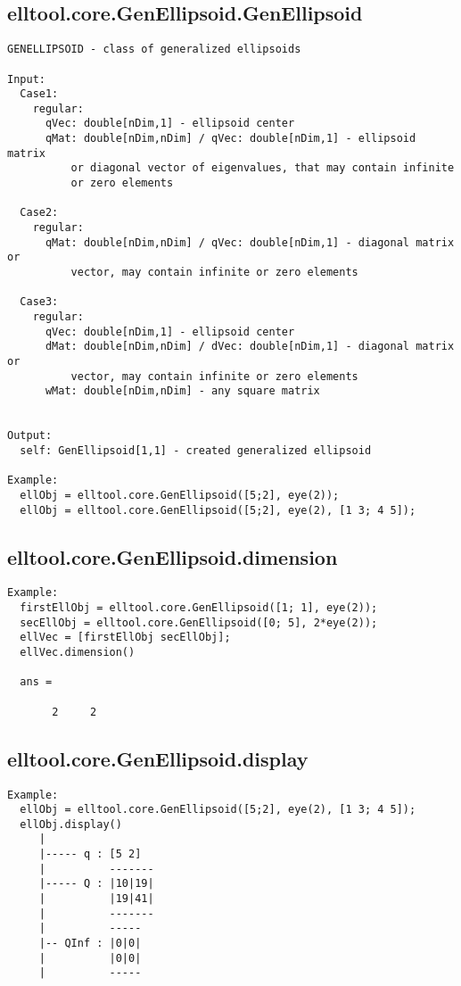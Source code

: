 \subsection{\texorpdfstring{elltool.core.GenEllipsoid.GenEllipsoid}{GenEllipsoid}}\label{method:elltool.core.GenEllipsoid.GenEllipsoid}
\begin{verbatim}
GENELLIPSOID - class of generalized ellipsoids

Input:
  Case1:
    regular:
      qVec: double[nDim,1] - ellipsoid center
      qMat: double[nDim,nDim] / qVec: double[nDim,1] - ellipsoid matrix
          or diagonal vector of eigenvalues, that may contain infinite
          or zero elements

  Case2:
    regular:
      qMat: double[nDim,nDim] / qVec: double[nDim,1] - diagonal matrix or
          vector, may contain infinite or zero elements

  Case3:
    regular:
      qVec: double[nDim,1] - ellipsoid center
      dMat: double[nDim,nDim] / dVec: double[nDim,1] - diagonal matrix or
          vector, may contain infinite or zero elements
      wMat: double[nDim,nDim] - any square matrix


Output:
  self: GenEllipsoid[1,1] - created generalized ellipsoid

Example:
  ellObj = elltool.core.GenEllipsoid([5;2], eye(2));
  ellObj = elltool.core.GenEllipsoid([5;2], eye(2), [1 3; 4 5]);
\end{verbatim}
\subsection{\texorpdfstring{elltool.core.GenEllipsoid.dimension}{dimension}}\label{method:elltool.core.GenEllipsoid.dimension}
\begin{verbatim}
Example:
  firstEllObj = elltool.core.GenEllipsoid([1; 1], eye(2));
  secEllObj = elltool.core.GenEllipsoid([0; 5], 2*eye(2));
  ellVec = [firstEllObj secEllObj];
  ellVec.dimension()

  ans =

       2     2
\end{verbatim}
\subsection{\texorpdfstring{elltool.core.GenEllipsoid.display}{display}}\label{method:elltool.core.GenEllipsoid.display}
\begin{verbatim}
Example:
  ellObj = elltool.core.GenEllipsoid([5;2], eye(2), [1 3; 4 5]);
  ellObj.display()
     |
     |----- q : [5 2]
     |          -------
     |----- Q : |10|19|
     |          |19|41|
     |          -------
     |          -----
     |-- QInf : |0|0|
     |          |0|0|
     |          -----
\end{verbatim}
